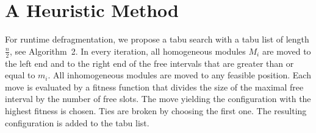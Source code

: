 \documentclass{article}
\begin{document}
\section{A Heuristic Method}
\label{sec:heuristic}

For runtime defragmentation, we propose a tabu search with a tabu list of length
$\frac{n}{2}$, see Algorithm~2. In every iteration, all homogeneous modules $M_i$ are
moved to the left end and to the right end of the free intervals
that are greater than or equal to $m_i$. All inhomogeneous modules
are moved to any feasible position. Each move is evaluated by a
fitness function that divides the size of the maximal free interval by
the number of free slots. The move yielding the
configuration with the highest fitness is chosen. Ties are broken by
choosing the first one. The resulting configuration is added to the
tabu list.
\end{document}
